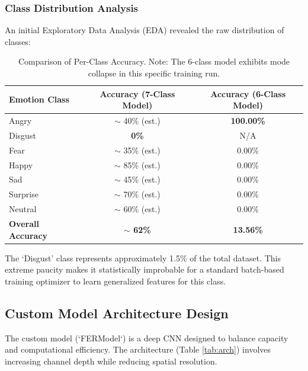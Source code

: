 \documentclass[a4paper,12pt]{article}
\begin{document}
\subsubsection{Class Distribution Analysis}
An initial Exploratory Data Analysis (EDA) revealed the raw distribution of classes:
\begin{table}[H]
\centering
\begin{tabular}{|l|c|c|}
\hline
\textbf{Emotion Class} & \textbf{Accuracy (7-Class Model)} & \textbf{Accuracy (6-Class Model)} \\ \hline
Angry & $\sim$ 40\% (est.) & \textbf{100.00\%} \\ \hline
Disgust & \textbf{0\%} & N/A \\ \hline
Fear & $\sim$ 35\% (est.) & 0.00\% \\ \hline
Happy & $\sim$ 85\% (est.) & 0.00\% \\ \hline
Sad & $\sim$ 45\% (est.) & 0.00\% \\ \hline
Surprise & $\sim$ 70\% (est.) & 0.00\% \\ \hline
Neutral & $\sim$ 60\% (est.) & 0.00\% \\ \hline
\textbf{Overall Accuracy} & \textbf{$\sim$ 62\%} & \textbf{13.56\%} \\ \hline
\end{tabular}
\caption{Comparison of Per-Class Accuracy. Note: The 6-class model exhibits mode collapse in this specific training run.}
\end{table}

The `Disgust' class represents approximately 1.5\% of the total dataset. This extreme paucity makes it statistically improbable for a standard batch-based training optimizer to learn generalized features for this class.

\subsection{Custom Model Architecture Design}
The custom model (`FERModel`) is a deep CNN designed to balance capacity and computational efficiency. The architecture (Table \ref{tab:arch}) involves increasing channel depth while reducing spatial resolution.
\end{document}
